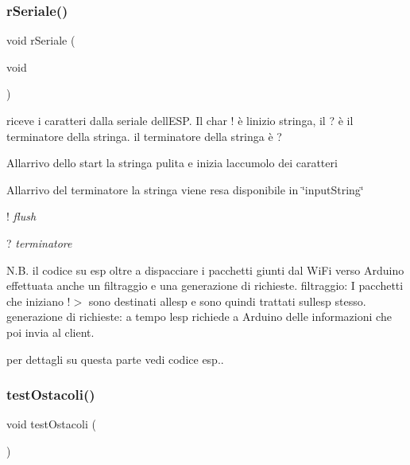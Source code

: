 \subsubsection{\texorpdfstring{r\+Seriale()}{rSeriale()}}
{\footnotesize\ttfamily void r\+Seriale (\begin{DoxyParamCaption}\item[{void}]{ }\end{DoxyParamCaption})}



riceve i caratteri dalla seriale dell\textquotesingle{}E\+SP. Il char \textquotesingle{}!\textquotesingle{} è l\textquotesingle{}inizio stringa, il \textquotesingle{}?\textquotesingle{} è il terminatore della stringa. il terminatore della stringa è ? 

All\textquotesingle{}arrivo dello start la stringa pulita e inizia l\textquotesingle{}accumolo dei caratteri

All\textquotesingle{}arrivo del terminatore la stringa viene resa disponibile in \char`\"{}input\+String\char`\"{}

! {\itshape flush}

? {\itshape terminatore}

N.\+B. il codice su esp oltre a dispacciare i pacchetti giunti dal Wi\+Fi verso Arduino effettuata anche un filtraggio e una generazione di richieste. filtraggio\+: I pacchetti che iniziano !$>$ sono destinati all\textquotesingle{}esp e sono quindi trattati sull\textquotesingle{}esp stesso. generazione di richieste\+: a tempo l\textquotesingle{}esp richiede a Arduino delle informazioni che poi invia al client.

per dettagli su questa parte vedi codice esp.. \mbox{\label{ari_pi__2_d_c__esp__08_8ino_a6f20cd3646bc1f8af9a4f9d5e45f5c90}} 
\subsubsection{\texorpdfstring{test\+Ostacoli()}{testOstacoli()}}
{\footnotesize\ttfamily void test\+Ostacoli (\begin{DoxyParamCaption}{ }\end{DoxyParamCaption})}




